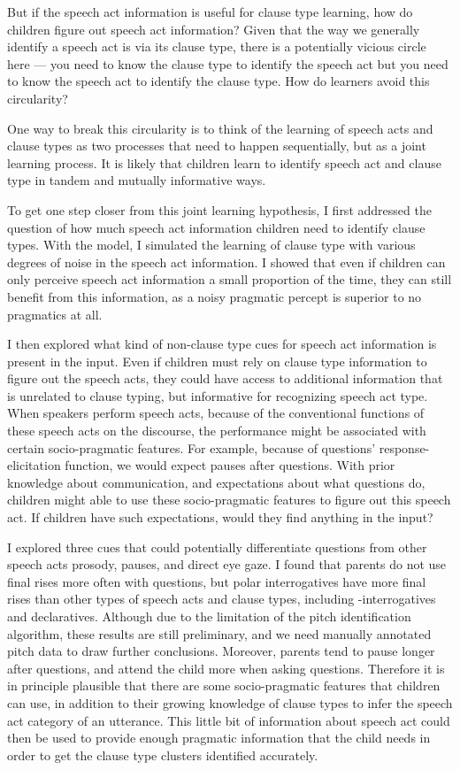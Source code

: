 But if the speech act information is useful for clause type learning, how do children figure out speech act information? Given that the way we generally identify a speech act is via its clause type, there is a potentially vicious circle here --- you need to know the clause type to identify the speech act but you need to know the speech act to identify the clause type. How do learners avoid this circularity?

One way to break this circularity is to  think of the learning of speech acts and clause types as two processes that need to happen sequentially, but as a joint learning process. It is likely that children learn to identify speech act and clause type in tandem and mutually informative ways.

To get one step closer from this joint learning hypothesis, I first addressed the question of how much speech act information children need to identify clause types. With the \plearnerabbr{} model, I simulated the learning of clause type with various degrees of noise in the speech act information. I showed that even if children can only perceive speech act information a small proportion of the time, they can still benefit from this information, as a noisy pragmatic percept is superior to no pragmatics at all. 

I then explored what kind of non-clause type cues for speech act information is present in the input. Even if children must rely on clause type information to figure out the speech acts, they could have access to additional information that is unrelated to clause typing, but informative for recognizing speech act type. When speakers perform speech acts, because of the conventional functions of these speech acts on the discourse, the performance might be associated with certain socio-pragmatic features. For example, because of questions' response-elicitation function, we would expect pauses after questions. With prior knowledge about communication, and expectations about what questions do, children might able to use these socio-pragmatic features to figure out this speech act. If children have such expectations, would they find anything in the input? 

I explored three cues that could potentially differentiate questions from other speech acts prosody, pauses, and direct eye gaze. I found that parents do not use final rises more often with questions, but polar interrogatives have more final rises than other types of speech acts and clause types, including \twh-interrogatives and declaratives. Although due to the limitation of the pitch identification algorithm, these results are still preliminary, and we need manually annotated pitch data to draw further conclusions. Moreover, parents tend to pause longer after questions, and attend the child more when asking questions. Therefore it is in principle plausible that there are some socio-pragmatic features that children can use, in addition to their growing knowledge of clause types to infer the speech act category of an utterance. This little bit of information about speech act could then be used to provide enough pragmatic information that the child needs in order to get the clause type clusters identified accurately.

